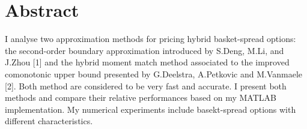 \documentclass[a4paper]{article}
\begin{document}
\section*{Abstract}
I analyse two approximation methods for pricing hybrid basket-spread options: the second-order boundary approximation introduced by S.Deng, M.Li, and J.Zhou [1] and the hybrid moment match method associated to the improved comonotonic upper bound presented by G.Deelstra, A.Petkovic and M.Vanmaele [2]. Both method are considered to be very fast and accurate. I present both methods and compare their relative performances based on my MATLAB implementation. My numerical experiments include basekt-spread options with different characteristics.

\newpage

\renewcommand{\cftsecleader}{\cftdotfill{\cftdotsep}}
\tableofcontents

\newpage
{}
\setcounter{page}{1}
\end{document}
